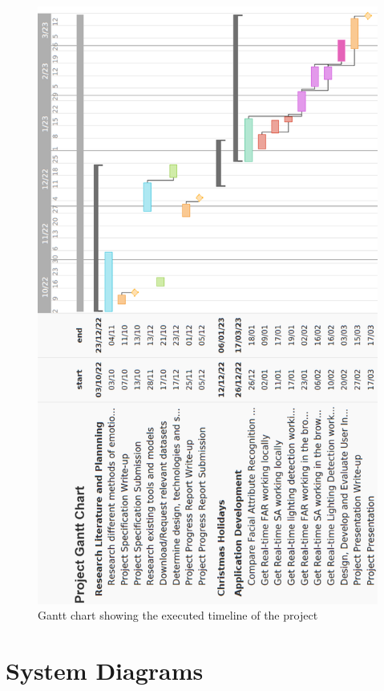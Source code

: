 \documentclass[12pt, a4paper]{article}
\begin{document}
\begin{appendices}
\begin{figure}[H]
    \centering
    \includegraphics[scale=0.58]{images/gantt2.png}
    \caption{Gantt chart showing the executed timeline of the project}
    \label{fig:gantt2}
\end{figure}

\section{System Diagrams}
\label{appendix:sad}


\end{appendices}
\end{document}
